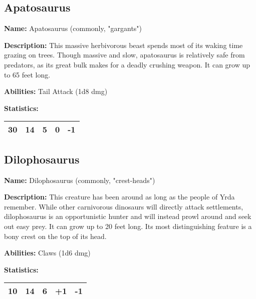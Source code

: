 \begin{multicols}{2}
\subsection{Apatosaurus}

\textbf{Name:} Apatosaurus (commonly, "gargants") 

\textbf{Description:} This massive herbivorous beast spends most of its waking time grazing on trees.
Though massive and slow, apatosaurus is relatively safe from predators, as its great bulk makes for a
deadly crushing weapon. It can grow up to 65 feet long.

\textbf{Abilities:} Tail Attack (1d8 dmg)

\textbf{Statistics:}

\begin{center}
{
\begin{xtabular}{|l|l|l|l|l|}
30 & 14 & 5 & 0 & -1 \\
\hline
\end{xtabular}
}
\end{center}

\subsection{Dilophosaurus}

\textbf{Name:} Dilophosaurus (commonly, "crest-heads") 

\textbf{Description:} This creature has been around as long as the people of Yrda remember.
While other carnivorous dinosaurs will directly attack settlements, dilophosaurus is an
opportunistic hunter and will instead prowl around and seek out easy prey. It can grow up
to 20 feet long. Its most distinguishing feature is a bony crest on the top of its head.

\textbf{Abilities:} Claws (1d6 dmg)

\textbf{Statistics:}

\begin{center}
{
\begin{xtabular}{|l|l|l|l|l|}
10 & 14 & 6 & +1 & -1 \\
\hline
\end{xtabular}
}
\end{center}


\end{multicols}
